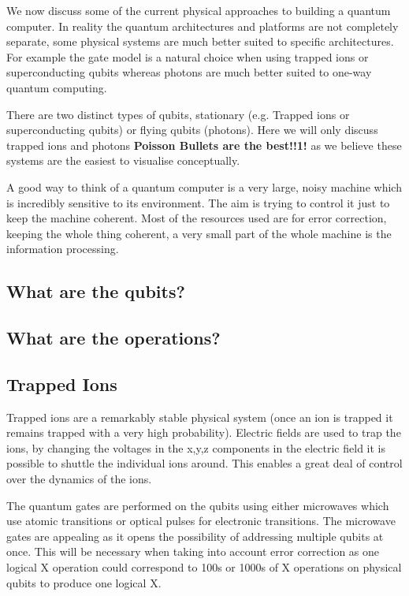 We now discuss some of the current physical approaches to building a quantum computer. In reality the quantum architectures and platforms are not completely separate, some physical systems are much better suited to specific architectures. For example the gate model is a natural choice when using trapped ions or superconducting qubits whereas photons are much better suited to one-way quantum computing. 

There are two distinct types of qubits, stationary (e.g. Trapped ions or superconducting qubits) or flying qubits (photons). Here we will only discuss trapped ions and photons \textbf{Poisson Bullets are the best!!1!} as we believe these systems are the easiest to visualise conceptually. 

A good way to think of a quantum computer is a very large, noisy machine which is incredibly sensitive to its environment. The aim is trying to control it just to keep the machine coherent. Most of the resources used are for error correction, keeping the whole thing coherent, a very small part of the whole machine is the information processing. 

\subsection{What are the qubits?}

\subsection{What are the operations?}

\subsection{Trapped Ions}

Trapped ions are a remarkably stable physical system (once an ion is trapped it remains trapped with a very high probability). Electric fields are used to trap the ions, by changing the voltages in the x,y,z components in the electric field it is possible to shuttle the individual ions around. This enables a great deal of control over the dynamics of the ions.

The quantum gates are performed on the qubits using either microwaves which use atomic transitions or optical pulses for electronic transitions. The microwave gates are appealing as it opens the possibility of addressing multiple qubits at once. This will be necessary when taking into account error correction as one logical X operation could correspond to 100s or 1000s of X operations on physical qubits to produce one logical X. 

